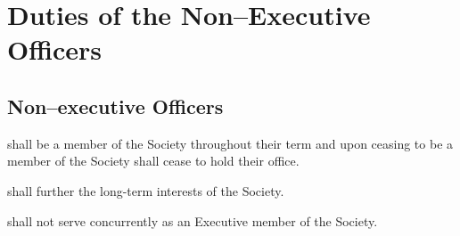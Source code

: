 \begin{longenum}[ label*=\thesubsection.\arabic*., align=left]
\end{longenum}

\newpage

\section{Duties of the Non--Executive Officers}

\subsection {Non--executive Officers} 
\begin{longenum}[ label*=\thesubsection.\arabic*., align=left]
	\item shall be a member of the Society throughout their term and upon ceasing to be a member of the Society shall cease to hold their office.
	\item shall further the long-term interests of the Society.
    \item shall not serve concurrently as an Executive member of the Society.
\end{longenum}

